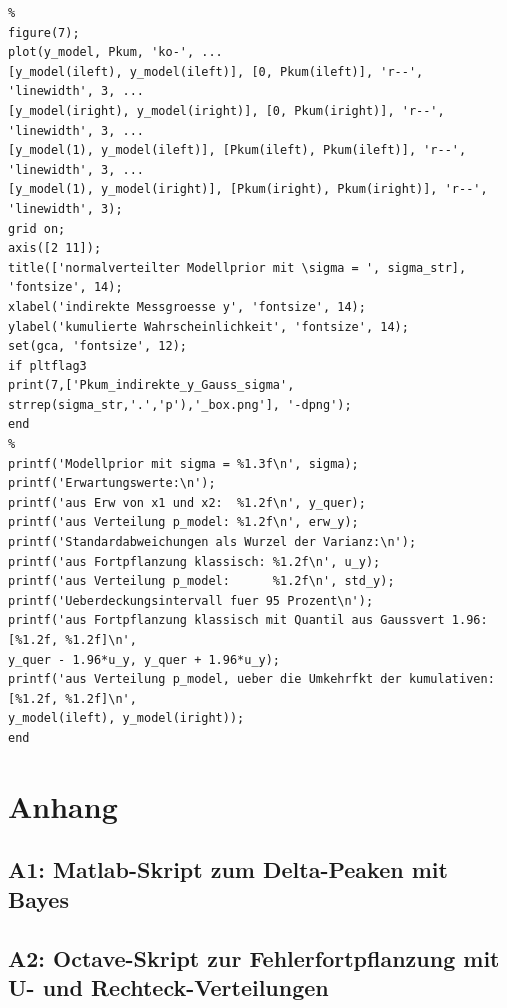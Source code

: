 \begin{verbatim}
%
figure(7);
plot(y_model, Pkum, 'ko-', ...
[y_model(ileft), y_model(ileft)], [0, Pkum(ileft)], 'r--', 'linewidth', 3, ...
[y_model(iright), y_model(iright)], [0, Pkum(iright)], 'r--', 'linewidth', 3, ...
[y_model(1), y_model(ileft)], [Pkum(ileft), Pkum(ileft)], 'r--', 'linewidth', 3, ...
[y_model(1), y_model(iright)], [Pkum(iright), Pkum(iright)], 'r--', 'linewidth', 3);
grid on;
axis([2 11]);
title(['normalverteilter Modellprior mit \sigma = ', sigma_str], 'fontsize', 14);
xlabel('indirekte Messgroesse y', 'fontsize', 14);
ylabel('kumulierte Wahrscheinlichkeit', 'fontsize', 14);
set(gca, 'fontsize', 12);
if pltflag3
print(7,['Pkum_indirekte_y_Gauss_sigma', strrep(sigma_str,'.','p'),'_box.png'], '-dpng');
end
%
printf('Modellprior mit sigma = %1.3f\n', sigma);
printf('Erwartungswerte:\n');
printf('aus Erw von x1 und x2:  %1.2f\n', y_quer);
printf('aus Verteilung p_model: %1.2f\n', erw_y);
printf('Standardabweichungen als Wurzel der Varianz:\n');
printf('aus Fortpflanzung klassisch: %1.2f\n', u_y);
printf('aus Verteilung p_model:      %1.2f\n', std_y);
printf('Ueberdeckungsintervall fuer 95 Prozent\n');
printf('aus Fortpflanzung klassisch mit Quantil aus Gaussvert 1.96:  [%1.2f, %1.2f]\n',
y_quer - 1.96*u_y, y_quer + 1.96*u_y);
printf('aus Verteilung p_model, ueber die Umkehrfkt der kumulativen: [%1.2f, %1.2f]\n',
y_model(ileft), y_model(iright));
end
\end{verbatim}

\newpage
\section{Anhang}
\subsection{A1: Matlab-Skript zum Delta-Peaken mit Bayes}

\subsection{A2: Octave-Skript zur Fehlerfortpflanzung mit U- und Rechteck-Verteilungen}


